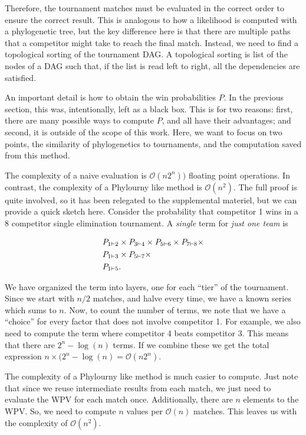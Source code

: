 \documentclass{article}
\begin{document}
Therefore, the tournament matches must be evaluated in the correct order to ensure the correct result. This is analogous
to how a likelihood is computed with a phylogenetic tree, but the key difference here is that there are multiple paths
that a competitor might take to reach the final match. Instead, we need to find a topological sorting of the tournament
DAG. A topological sorting is list of the nodes of a DAG such that, if the list is read left to right, all the
dependencies are satisfied. 

An important detail is how to obtain the win probabilities $P$. In the previous section, this was, intentionally, left
as a black box. This is for two reasons: first, there are many possible ways to compute $P$, and all have their
advantages; and second, it is outside of the scope of this work. Here, we want to focus on two points, the similarity
of phylogenetics to tournaments, and the computation saved from this method.

The complexity of a naive evaluation is $\mathcal{O}(n2^{n}))$ floating point operations. In contrast, the
complexity of a Phylourny like method is $\mathcal{O}(n^2)$. The full proof is quite involved, so it has been relegated
to the supplemental materiel, but we can provide a quick sketch here. Consider the probability that competitor 1 wins in
a 8 competitor single elimination tournament. A \textit{single} term for \textit{just one team} is

\begin{align*}
  &P_{1 \vdash 2} \times P_{3 \vdash 4} \times P_{5 \vdash 6} \times P_{7 \vdash 8} \times \\
  &P_{1 \vdash 3} \times P_{5 \vdash 7} \times \\
  &P_{1 \vdash 5}.
\end{align*}

We have organized the term into layers, one for each ``tier'' of the tournament. Since we start with $n/2$ matches, and
halve every time, we have a known series which sums to $n$. Now, to count the number of terms, we note that we have a
``choice'' for every factor that does not involve competitor 1. For example, we also need to compute the term where
competitor 4 beats competitor 3. This means that there are $2^n - \log(n)$ terms. If we combine these we get the total
expression $n \times (2^n - \log(n) = \mathcal{O} (n2^n)$.

The complexity of a Phylourny like method is much easier to compute. Just note that since we reuse intermediate results
from each match, we just need to evaluate the WPV for each match once. Additionally, there are $n$ elements to the WPV.
So, we need to compute $n$ values per $\mathcal{O}(n)$ matches. This leaves us with the complexity of
$\mathcal{O}(n^2)$.
\end{document}
